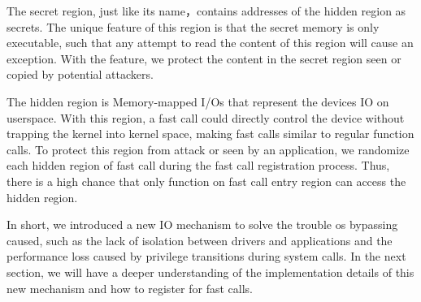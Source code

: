 The secret region, just like its name，contains addresses of the hidden region as secrets. The unique feature of this region is that the secret memory is only executable, such that any attempt to read the content of this region will cause an exception. With the feature, we protect the content in the secret region seen or copied by potential attackers.

The hidden region is Memory-mapped I/Os that represent the devices IO on userspace. With this region, a fast call could directly control the device without trapping the kernel into kernel space, making fast calls similar to regular function calls. To protect this region from attack or seen by an application, we randomize each hidden region of fast call during the fast call registration process. Thus, there is a high chance that only function on fast call entry region can access the hidden region.

In short, we introduced a new IO mechanism to solve the trouble os bypassing caused,  such as the lack of isolation between drivers and applications and the performance loss caused by privilege transitions during system calls. In the next section, we will have a deeper understanding of the implementation details of this new mechanism and how to register for fast calls.

\cleardoublepage

